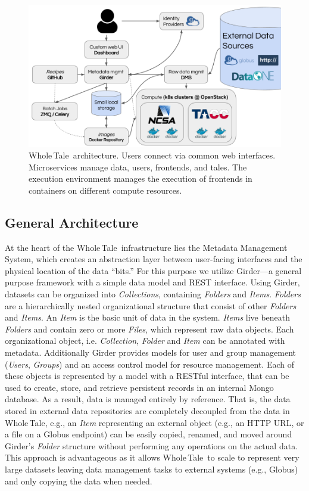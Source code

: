 \documentclass[review]{elsarticle}
\newcommand{\wt}{Whole\,Tale}
\begin{document}
\begin{figure}[ht!]
\centering
  \includegraphics[trim=0in 0in 0in 0in,clip,width=.75\columnwidth]{Arch_WT.png}
\caption{\wt\ architecture. Users connect via common web interfaces. Microservices manage data, users, frontends, and tales. The execution environment manages the execution of frontends in containers on different compute resources. \label{fig:arch}}
 \end{figure}

\subsection{General Architecture}
At the heart of the \wt\ infrastructure lies the Metadata Management System,
which creates an abstraction layer between user-facing interfaces and the physical
location of the data ``bits.'' For this purpose we utilize Girder\cite{girder}---a general purpose framework with a simple data
model and REST interface. 
Using Girder, datasets can be organized into \emph{Collections}, containing \emph{Folders} and \emph{Items}. \emph{Folders}
are a hierarchically nested organizational structure that consist of other
\emph{Folders} and \emph{Items}. An \emph{Item} is the basic unit of data in the
system. \emph{Items} live beneath \emph{Folders} and contain zero or more
\emph{Files}, which represent raw data objects. Each organizational object, i.e.
\emph{Collection}, \emph{Folder} and \emph{Item} can be annotated with metadata.
Additionally Girder provides
models for user and group management (\emph{Users}, \emph{Groups}) and an access control model for resource management. 
Each of these objects is represented by a model with a RESTful
interface, that can be used to create, store, and retrieve persistent records
in an internal Mongo database. %
As a result, data is managed entirely by reference. That is, 
the data stored in external data repositories are completely decoupled
from the data in \wt, e.g., an \emph{Item} representing an external object (e.g., an HTTP URL, or a file on a Globus endpoint) can be easily copied, renamed, and moved around
Girder's \emph{Folder} structure without performing any operations on the
actual data. This approach is advantageous as it allows \wt\ to 
scale to represent very large datasets leaving data management tasks to
external systems (e.g., Globus) and only copying the data when needed. 
\end{document}
